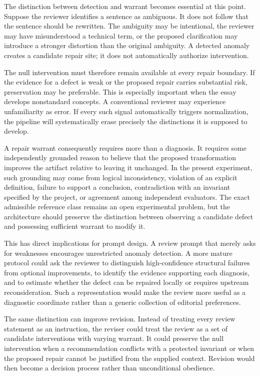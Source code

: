 \documentclass[11pt]{article}
\begin{document}
The distinction between detection and warrant becomes essential at this point. Suppose the reviewer identifies a sentence as ambiguous. It does not follow that the sentence should be rewritten. The ambiguity may be intentional, the reviewer may have misunderstood a technical term, or the proposed clarification may introduce a stronger distortion than the original ambiguity. A detected anomaly creates a candidate repair site; it does not automatically authorize intervention.

The null intervention must therefore remain available at every repair boundary. If the evidence for a defect is weak or the proposed repair carries substantial risk, preservation may be preferable. This is especially important when the essay develops nonstandard concepts. A conventional reviewer may experience unfamiliarity as error. If every such signal automatically triggers normalization, the pipeline will systematically erase precisely the distinctions it is supposed to develop.

A repair warrant consequently requires more than a diagnosis. It requires some independently grounded reason to believe that the proposed transformation improves the artifact relative to leaving it unchanged. In the present experiment, such grounding may come from logical inconsistency, violation of an explicit definition, failure to support a conclusion, contradiction with an invariant specified by the project, or agreement among independent evaluators. The exact admissible reference class remains an open experimental problem, but the architecture should preserve the distinction between observing a candidate defect and possessing sufficient warrant to modify it.

This has direct implications for prompt design. A review prompt that merely asks for weaknesses encourages unrestricted anomaly detection. A more mature protocol could ask the reviewer to distinguish high-confidence structural failures from optional improvements, to identify the evidence supporting each diagnosis, and to estimate whether the defect can be repaired locally or requires upstream reconsideration. Such a representation would make the review more useful as a diagnostic coordinate rather than a generic collection of editorial preferences.

The same distinction can improve revision. Instead of treating every review statement as an instruction, the reviser could treat the review as a set of candidate interventions with varying warrant. It could preserve the null intervention when a recommendation conflicts with a protected invariant or when the proposed repair cannot be justified from the supplied context. Revision would then become a decision process rather than unconditional obedience.
\end{document}
